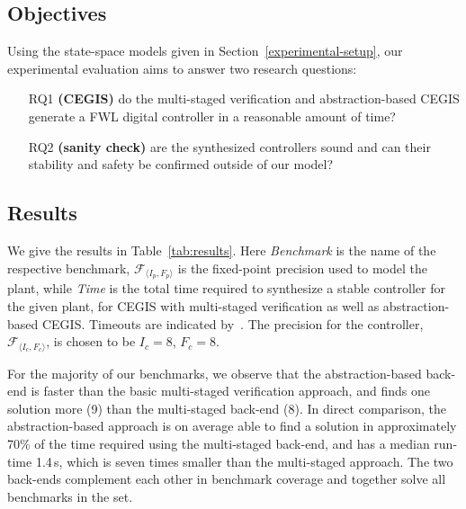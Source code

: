 \documentclass[runningheads,a4paper]{llncs}
\newcommand{\xmark}{\ding{55}}
\begin{document}
\subsection{Objectives}

Using the state-space models given in Section~\ref{experimental-setup}, 
our experimental evaluation aims to answer two research questions:
%


\begin{enumerate}

\item[RQ1] \textbf{(CEGIS)} do the multi-staged verification and abstraction-based
CEGIS generate a FWL digital controller in a reasonable amount of time?

\item[RQ2] \textbf{(sanity check)} are the synthesized controllers sound
and can their stability and safety be confirmed outside of our model?

\end{enumerate}


\subsection{Results}

We give the results in Table~\ref{tab:results}.  Here \textit{Benchmark} is
the name of the respective benchmark, $\mathcal{F}_{\langle I_p,F_p
\rangle}$ is the fixed-point precision used to model the plant, while
\textit{Time} is the total time required to synthesize a stable controller
for the given plant, for CEGIS with multi-staged verification as well as
abstraction-based CEGIS.  Timeouts are indicated by~\xmark.  The precision
for the controller, $\mathcal{F}_{\langle I_c,F_c \rangle}$, is chosen to be
$I_c = 8$, $F_c = 8$.

For the majority of our benchmarks, we observe that the abstraction-based
back-end is faster than the basic multi-staged verification approach, and
finds one solution more (9) than the multi-staged back-end (8).
In direct comparison, the
abstraction-based approach is on average able to find a solution in
approximately 70\% of the time required using the multi-staged back-end, and
has a median run-time 1.4\,s, which is seven times smaller than the
multi-staged approach.  The two back-ends complement each other in benchmark
coverage and together solve all benchmarks in the set.
\end{document}

